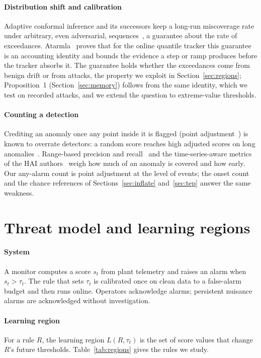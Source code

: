 \documentclass[sigconf,review,anonymous]{acmart}
\begin{document}
\paragraph{Distribution shift and calibration}
Adaptive conformal inference and its successors keep a long-run miscoverage rate under arbitrary, even
adversarial, sequences~\cite{gibbs2021aci, bastani2022multivalid}, a guarantee about the rate of
exceedances. Atarmla~\cite{atarmla2026price} proves that for the online quantile tracker this guarantee
is an accounting identity and bounds the evidence a step or ramp produces before the tracker absorbs
it. The guarantee holds whether the exceedances come from benign drift or from attacks, the property we
exploit in Section~\ref{sec:regions}; Proposition~1 (Section~\ref{sec:memory}) follows from the same
identity, which we test on recorded attacks, and we extend the question to extreme-value thresholds.

\paragraph{Counting a detection}
Crediting an anomaly once any point inside it is flagged (point adjustment~\cite{xu2018vae}) is known
to overrate detectors: a random score reaches high adjusted scores on long
anomalies~\cite{kim2022rigorous}. Range-based precision and recall~\cite{tatbul2018precision} and the
time-series-aware metrics of the HAI authors~\cite{hwang2019tapr} weigh how much of an anomaly is covered
and how early. Our any-alarm count is point adjustment at the level of events; the onset count and the
chance references of Sections~\ref{sec:inflate} and~\ref{sec:tep} answer the same weakness.

\section{Threat model and learning regions}
\label{sec:threat}

\paragraph{System}
A monitor computes a score $s_t$ from plant telemetry and raises an alarm when $s_t > \tau_t$. The
rule that sets $\tau_t$ is calibrated once on clean data to a false-alarm budget and then runs
online. Operators acknowledge alarms; persistent nuisance alarms are acknowledged without
investigation.

\paragraph{Learning region}
For a rule $R$, the learning region $L(R, \tau_t)$ is the set of score values that change $R$'s
future thresholds. Table~\ref{tab:regions} gives the rules we study.
\end{document}
